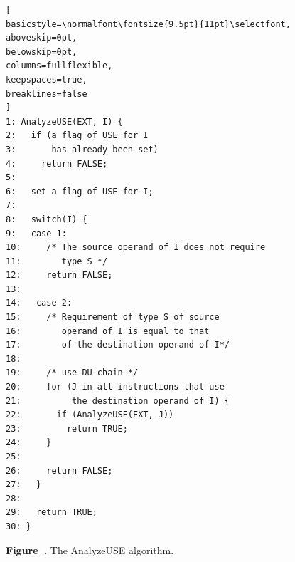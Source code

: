\par\vspace{1.2em}

\begin{center}
\begin{minipage}{0.52\textwidth}

\begin{lstlisting}[
basicstyle=\normalfont\fontsize{9.5pt}{11pt}\selectfont,
aboveskip=0pt,
belowskip=0pt,
columns=fullflexible,
keepspaces=true,
breaklines=false
]
1: AnalyzeUSE(EXT, I) {
2:   if (a flag of USE for I
3:       has already been set)
4:     return FALSE;
5:
6:   set a flag of USE for I;
7:
8:   switch(I) {
9:   case 1:
10:     /* The source operand of I does not require
11:        type S */
12:     return FALSE;
13:
14:   case 2:
15:     /* Requirement of type S of source
16:        operand of I is equal to that
17:        of the destination operand of I*/
18:
19:     /* use DU-chain */
20:     for (J in all instructions that use
21:          the destination operand of I) {
22:       if (AnalyzeUSE(EXT, J))
23:         return TRUE;
24:     }
25:
26:     return FALSE;
27:   }
28:
29:   return TRUE;
30: }
\end{lstlisting}

\end{minipage}
\end{center}

\vspace{0.8em}

\label{fig:figure8}

\begin{center}
\small\textbf{Figure~\thefigure.} The AnalyzeUSE algorithm.
\end{center}

\par\vspace{1.2em}
